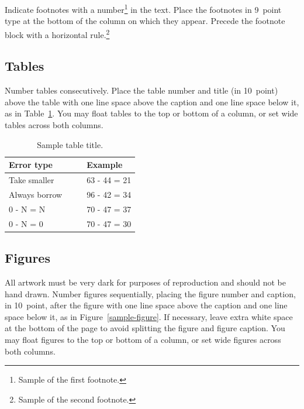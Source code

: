 \documentclass[10pt,letterpaper]{article}
\begin{document}
Indicate footnotes with a number\footnote{Sample of the first
footnote.} in the text. Place the footnotes in 9~point type at the
bottom of the column on which they appear. Precede the footnote block
with a horizontal rule.\footnote{Sample of the second footnote.}


\subsection{Tables}

Number tables consecutively. Place the table number and title (in
10~point) above the table with one line space above the caption and
one line space below it, as in Table~\ref{sample-table}. You may float
tables to the top or bottom of a column, or set wide tables across
both columns.

\begin{table}[!ht]
\begin{center} 
\caption{Sample table title.} 
\label{sample-table} 
\vskip 0.12in
\begin{tabular}{ll} 
\hline
Error type    &  Example \\
\hline
Take smaller        &   63 - 44 = 21 \\
Always borrow~~~~   &   96 - 42 = 34 \\
0 - N = N           &   70 - 47 = 37 \\
0 - N = 0           &   70 - 47 = 30 \\
\hline
\end{tabular} 
\end{center} 
\end{table}


\subsection{Figures}

All artwork must be very dark for purposes of reproduction and should
not be hand drawn. Number figures sequentially, placing the figure
number and caption, in 10~point, after the figure with one line space
above the caption and one line space below it, as in
Figure~\ref{sample-figure}. If necessary, leave extra white space at
the bottom of the page to avoid splitting the figure and figure
caption. You may float figures to the top or bottom of a column, or
set wide figures across both columns.
\end{document}
